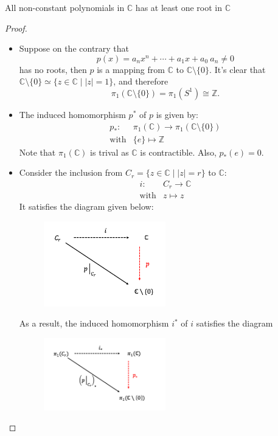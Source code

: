 \begin{corollary}
All non-constant polynomials in $\mathbb{C}$ has at least one root in $\mathbb{C}$
\end{corollary}

\begin{proof}
\begin{itemize}
\item
Suppose on the contrary that 
\[
p(x)=a_nx^n+\cdots+a_1x+a_0\ a_n\ne0
\]
has no roots, then $p$ is a mapping from $\mathbb{C}$ to $\mathbb{C}\setminus\{0\}$.
It's clear that $\mathbb{C}\setminus\{0\}\simeq\{z\in\mathbb{C}\mid|z|=1\}$, and therefore
\[
\pi_1(\mathbb{C}\setminus\{0\})=\pi_1(S^1)\cong\mathbb{Z}.
\]
\item
The induced homomorphism $p^*$ of $p$ is given by:
\[
\begin{array}{ll}
p_*:&\pi_1(\mathbb{C})\to \pi_1(\mathbb{C}\setminus\{0\})\\
\text{with}&\{e\}\mapsto\mathbb{Z}
\end{array}
\]
Note that $\pi_1(\mathbb{C})$ is trival as $\mathbb{C}$ is contractible. Also, $p_*(e)=0$.
\item
Consider the inclusion from $C_r=\{z\in\mathbb{C}\mid |z|=r\}$ to $\mathbb{C}$:
\[
\begin{array}{ll}
i:&C_r\to\mathbb{C}\\
\text{with}&z\mapsto z
\end{array}
\]
It satisfies the diagram given below:
\begin{figure}[H]
\centering
\includegraphics[width=0.5\textwidth]{week13/f_31}
\end{figure}
As a result, the induced homomorphism $i^*$ of $i$ satisfies the diagram
\begin{figure}[H]
\centering
\includegraphics[width=0.5\textwidth]{week13/f_32}

\end{figure}
\end{itemize}
\end{proof}
